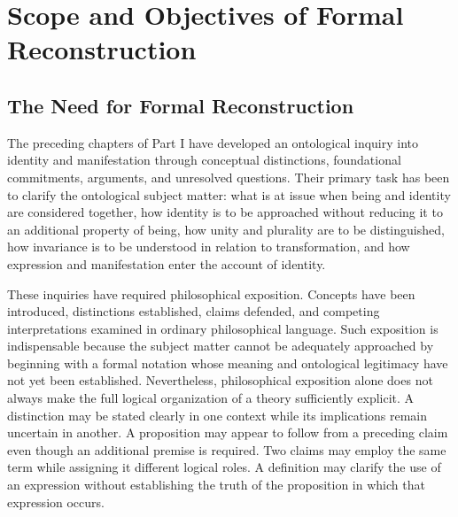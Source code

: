 
\section{Scope and Objectives of Formal Reconstruction}
\label{sec:ch07_s01}

\subsection{The Need for Formal Reconstruction}

The preceding chapters of Part I have developed an ontological inquiry into
identity and manifestation through conceptual distinctions, foundational
commitments, arguments, and unresolved questions. Their primary task has been
to clarify the ontological subject matter: what is at issue when being and
identity are considered together, how identity is to be approached without
reducing it to an additional property of being, how unity and plurality are
to be distinguished, how invariance is to be understood in relation to
transformation, and how expression and manifestation enter the account of
identity.

These inquiries have required philosophical exposition. Concepts have been
introduced, distinctions established, claims defended, and competing
interpretations examined in ordinary philosophical language. Such exposition
is indispensable because the subject matter cannot be adequately approached
by beginning with a formal notation whose meaning and ontological legitimacy
have not yet been established. Nevertheless, philosophical exposition alone
does not always make the full logical organization of a theory sufficiently
explicit. A distinction may be stated clearly in one context while its
implications remain uncertain in another. A proposition may appear to follow
from a preceding claim even though an additional premise is required. Two
claims may employ the same term while assigning it different logical roles.
A definition may clarify the use of an expression without establishing the
truth of the proposition in which that expression occurs.


